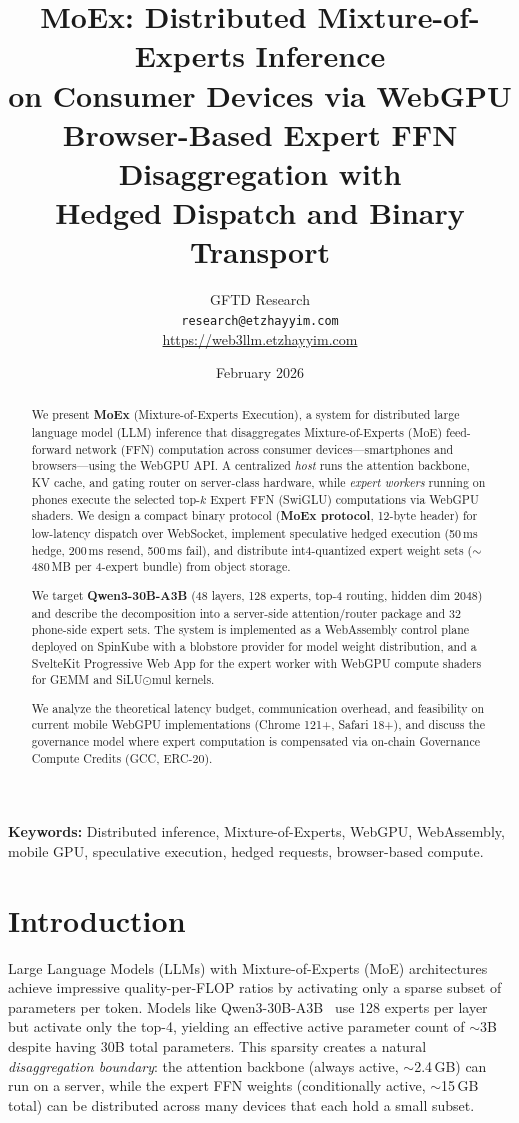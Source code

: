 \documentclass[11pt,a4paper]{article}
\title{%
  \textbf{MoEx: Distributed Mixture-of-Experts Inference\\
  on Consumer Devices via WebGPU}\\[0.5em]
  \large Browser-Based Expert FFN Disaggregation with\\
  Hedged Dispatch and Binary Transport
}
\author{
  GFTD Research\\
  \texttt{research@etzhayyim.com}\\
  \url{https://web3llm.etzhayyim.com}
}
\date{February 2026}
\begin{document}
\maketitle

\begin{abstract}
We present \textbf{MoEx} (Mixture-of-Experts Execution), a system for
distributed large language model (LLM) inference that disaggregates
Mixture-of-Experts (MoE) feed-forward network (FFN) computation across
consumer devices---smartphones and browsers---using the WebGPU API.
A centralized \emph{host} runs the attention backbone, KV cache, and
gating router on server-class hardware, while \emph{expert workers}
running on phones execute the selected top-$k$ Expert FFN (SwiGLU)
computations via WebGPU shaders. We design a compact binary protocol
(\textbf{MoEx protocol}, 12-byte header) for low-latency dispatch over
WebSocket, implement speculative hedged execution (50\,ms hedge,
200\,ms resend, 500\,ms fail), and distribute int4-quantized expert
weight sets ($\sim$480\,MB per 4-expert bundle) from object storage.

We target \textbf{Qwen3-30B-A3B} (48 layers, 128 experts, top-4
routing, hidden dim 2048) and describe the decomposition into a
server-side attention/router package and 32 phone-side expert sets.
The system is implemented as a WebAssembly control plane deployed on
SpinKube
with a blobstore provider for model weight distribution, and a
SvelteKit Progressive Web App for the expert worker with WebGPU
compute shaders for GEMM and SiLU$\odot$mul kernels.

We analyze the theoretical latency budget, communication overhead, and
feasibility on current mobile WebGPU implementations (Chrome 121+,
Safari 18+), and discuss the governance model where expert computation
is compensated via on-chain Governance Compute Credits (GCC, ERC-20).
\end{abstract}

\textbf{Keywords:} Distributed inference, Mixture-of-Experts, WebGPU,
WebAssembly, mobile GPU, speculative execution, hedged requests,
browser-based compute.

\section{Introduction}
\label{sec:intro}

Large Language Models (LLMs) with Mixture-of-Experts (MoE)
architectures~\cite{shazeer2017outrageously,fedus2022switch} achieve
impressive quality-per-FLOP ratios by activating only a sparse subset
of parameters per token. Models like Qwen3-30B-A3B~\cite{qwen3} use
128 experts per layer but activate only the top-4, yielding an
effective active parameter count of $\sim$3B despite having 30B total
parameters. This sparsity creates a natural \emph{disaggregation
boundary}: the attention backbone (always active, $\sim$2.4\,GB) can
run on a server, while the expert FFN weights (conditionally active,
$\sim$15\,GB total) can be distributed across many devices that each
hold a small subset.
\end{document}
